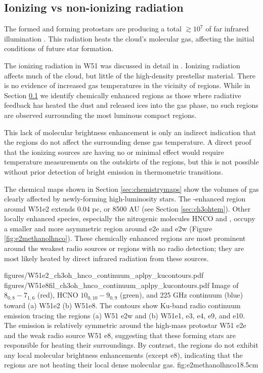 \documentclass{aa}
\begin{document}
\subsection{Ionizing vs non-ionizing radiation}
\label{sec:nonionizingradiation}
The formed and forming protostars are producing a total $\gtrsim10^7$ \lsun of
far infrared illumination \citep{Ginsburg2016b}.  This radiation heats the
cloud's molecular gas, affecting the initial conditions of future star
formation.

The ionizing radiation in W51 was discussed in detail in \citep{Ginsburg2016b}.
Ionizing radiation affects much of the cloud, but little of the high-density
prestellar material.  There is no evidence of increased gas temperatures in the
vicinity of \hii regions.  While in Section \ref{sec:nonionizingradiation} we
identify chemically enhanced regions as those where radiative feedback has
heated the dust and released ices into the gas phase, no such regions are
observed surrounding the most luminous compact \hii regions.

This lack of molecular brightness enhancement is only an indirect indication
that the \hii regions do not affect the surrounding dense gas temperature.  A
direct proof that the ionizing sources are having no or minimal effect would
require temperature measurements on the outskirts of the \hii regions, but this
is not possible without prior detection of bright emission in thermometric
transitions.

The chemical maps shown in Section \ref{sec:chemistrymaps} show the volumes of
gas clearly affected by newly-forming high-luminosity stars.  The
\methanol-enhanced region around W51e2 extends 0.04 pc, or 8500 AU (see Section
\ref{sec:ch3ohtem}). Other locally enhanced species, especially the nitrogenic
molecules HNCO and \formamide, occupy a smaller and more asymmetric region
around e2e and e2w (Figure \ref{fig:e2methanolhnco}).  These chemically enhanced
regions are most prominent around the weakest radio sources or regions with
no radio detection; they are most likely heated by direct infrared radiation
from these sources.

\FigureTwo
{figures/W51e2_ch3oh_hnco_continuum_aplpy_kucontours.pdf}
{figures/W51e8fil_ch3oh_hnco_continuum_aplpy_kucontours.pdf}
{Image of \methanol $8_{0,8}-7_{1,6}$ (red), HCNO $10_{0,10}-9_{0,9}$ (green), and 225 GHz
continuum (blue) toward (a) W51e2 (b) W51e8.  The contours show Ku-band radio continuum
emission tracing the \hii regions (a) W51 e2w and (b) W51e1, e3, e4, e9, and
e10.  The \methanol emission is relatively symmetric around the high-mass
protostar W51 e2e and the weak radio source W51 e8, suggesting that these
forming stars are responsible for heating their surroundings.  By contrast, the
\hii regions do not exhibit any local molecular brightness enhancements (except
e8), indicating that the \hii regions are not heating their local dense
molecular gas.}
{fig:e2methanolhnco}{1}{8.5cm}
 
\end{document}
